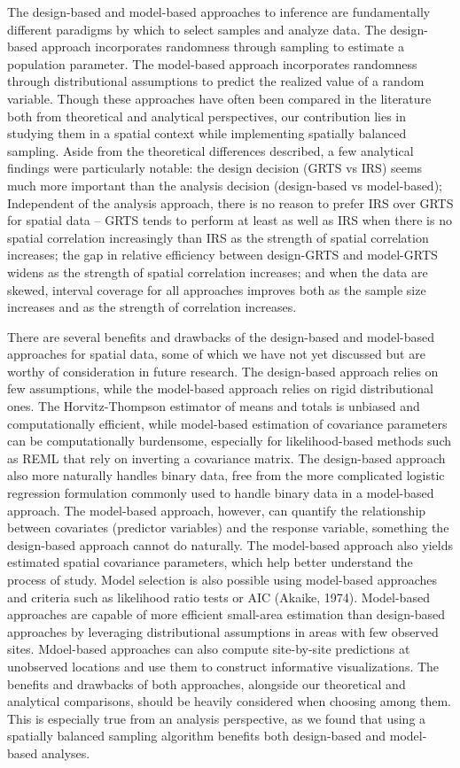 \documentclass[]{elsarticle} %
\begin{document}
The design-based and model-based approaches to inference are
fundamentally different paradigms by which to select samples and analyze
data. The design-based approach incorporates randomness through sampling
to estimate a population parameter. The model-based approach
incorporates randomness through distributional assumptions to predict
the realized value of a random variable. Though these approaches have
often been compared in the literature both from theoretical and
analytical perspectives, our contribution lies in studying them in a
spatial context while implementing spatially balanced sampling. Aside
from the theoretical differences described, a few analytical findings
were particularly notable: the design decision (GRTS vs IRS) seems much
more important than the analysis decision (design-based vs model-based);
Independent of the analysis approach, there is no reason to prefer IRS
over GRTS for spatial data -- GRTS tends to perform at least as well as
IRS when there is no spatial correlation increasingly than IRS as the
strength of spatial correlation increases; the gap in relative
efficiency between design-GRTS and model-GRTS widens as the strength of
spatial correlation increases; and when the data are skewed, interval
coverage for all approaches improves both as the sample size increases
and as the strength of correlation increases.

There are several benefits and drawbacks of the design-based and
model-based approaches for spatial data, some of which we have not yet
discussed but are worthy of consideration in future research. The
design-based approach relies on few assumptions, while the model-based
approach relies on rigid distributional ones. The Horvitz-Thompson
estimator of means and totals is unbiased and computationally efficient,
while model-based estimation of covariance parameters can be
computationally burdensome, especially for likelihood-based methods such
as REML that rely on inverting a covariance matrix. The design-based
approach also more naturally handles binary data, free from the more
complicated logistic regression formulation commonly used to handle
binary data in a model-based approach. The model-based approach,
however, can quantify the relationship between covariates (predictor
variables) and the response variable, something the design-based
approach cannot do naturally. The model-based approach also yields
estimated spatial covariance parameters, which help better understand
the process of study. Model selection is also possible using model-based
approaches and criteria such as likelihood ratio tests or AIC (Akaike,
1974). Model-based approaches are capable of more efficient small-area
estimation than design-based approaches by leveraging distributional
assumptions in areas with few observed sites. Mdoel-based approaches can
also compute site-by-site predictions at unobserved locations and use
them to construct informative visualizations. The benefits and drawbacks
of both approaches, alongside our theoretical and analytical
comparisons, should be heavily considered when choosing among them. This
is especially true from an analysis perspective, as we found that using
a spatially balanced sampling algorithm benefits both design-based and
model-based analyses.
\end{document}
